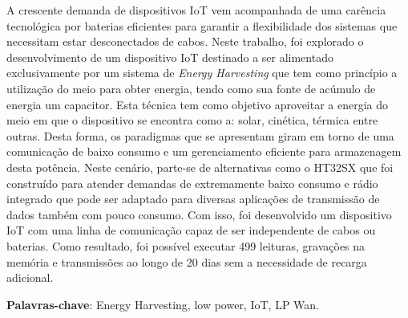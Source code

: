 
\setlength{\absparsep}{18pt} %
\begin{resumo}
    A crescente demanda de dispositivos IoT vem acompanhada de uma carência tecnológica por baterias eficientes para garantir a flexibilidade dos sistemas que necessitam estar desconectados de cabos. Neste trabalho, foi explorado o desenvolvimento de um dispositivo IoT destinado a ser alimentado exclusivamente por um sistema de \textit{Energy Harvesting} que tem como princípio a utilização do meio para obter energia, tendo como sua fonte de acúmulo de energia um capacitor. Esta técnica tem como objetivo aproveitar a energia do meio em que o dispositivo se encontra como a: solar, cinética, térmica entre outras. Desta forma, os paradigmas que se apresentam giram em torno de uma comunicação de baixo consumo e um gerenciamento eficiente para armazenagem desta potência. Neste cenário, parte-se de alternativas como o HT32SX que foi construído para atender demandas de extremamente baixo consumo e rádio integrado que pode ser adaptado para diversas aplicações de transmissão de dados também com pouco consumo. Com isso, foi desenvolvido um dispositivo IoT com uma linha de comunicação capaz de ser independente de cabos ou baterias. Como resultado, foi possível executar 499 leituras, gravações na memória e transmissões ao longo de 20 dias sem a necessidade de recarga adicional. 


    
 \textbf{Palavras-chave}: Energy Harvesting, low power, IoT, LP Wan.
\end{resumo}

